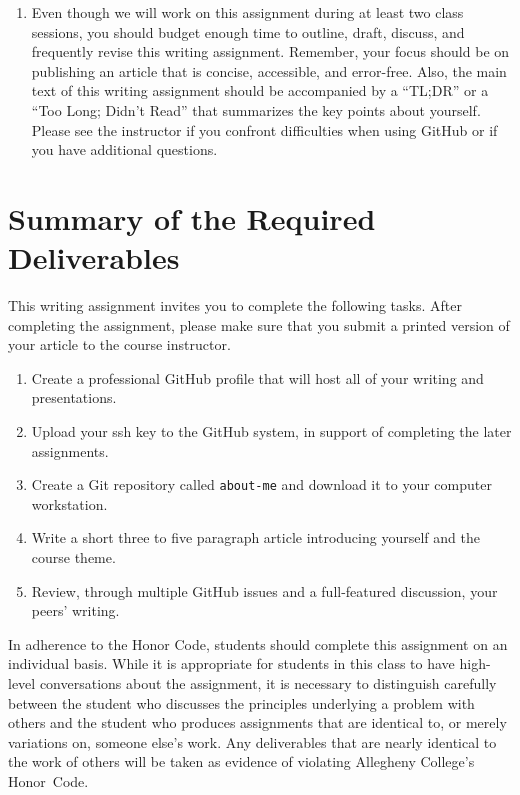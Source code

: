 \begin{enumerate}
  \item Even though we will work on this assignment during at least two class sessions, you should budget enough time to
    outline, draft, discuss, and frequently revise this writing assignment. Remember, your focus should be on publishing
    an article that is concise, accessible, and error-free. Also, the main text of this writing assignment should be
    accompanied by a ``TL;DR'' or a ``Too Long; Didn't Read'' that summarizes the key points about yourself. Please see
    the instructor if you confront difficulties when using GitHub or if you have additional questions.

\end{enumerate}

\vspace*{-.05in}
\section*{Summary of the Required Deliverables}

This writing assignment invites you to complete the following tasks. After completing the assignment, please make sure
that you submit a printed version of your article to the course instructor.

\vspace*{-.1in}
\begin{enumerate}
  \setlength{\itemsep}{0in}

  \item Create a professional GitHub profile that will host all of your writing and presentations.
  \item Upload your ssh key to the GitHub system, in support of completing the later assignments.
  \item Create a Git repository called {\tt about-me} and download it to your computer workstation.
  \item Write a short three to five paragraph article introducing yourself and the course theme.
  \item Review, through multiple GitHub issues and a full-featured discussion, your peers' writing.

\end{enumerate}
\vspace*{-.1in}

In adherence to the Honor Code, students should complete this assignment on an individual basis. While it is appropriate
for students in this class to have high-level conversations about the assignment, it is necessary to distinguish
carefully between the student who discusses the principles underlying a problem with others and the student who produces
assignments that are identical to, or merely variations on, someone else's work. Any deliverables that are nearly
identical to the work of others will be taken as evidence of violating Allegheny College's \mbox{Honor Code}.



